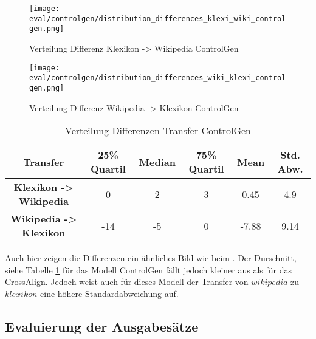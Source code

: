 \begin{figure}[H]
      \texttt{[image: eval/controlgen/distribution\_differences\_klexi\_wiki\_controlgen.png]}
      \caption{Verteilung Differenz Klexikon -> Wikipedia ControlGen}\label{fig:distribution_transfer_klexi_wiki_controlgen}
    \endminipage\hfill
      \texttt{[image: eval/controlgen/distribution\_differences\_wiki\_klexi\_controlgen.png]}
      \caption{Verteilung Differenz Wikipedia -> Klexikon ControlGen}\label{fig:distribution_transfer_wiki_klexi_controlgen}
    \endminipage\hfill      
 \end{figure}
 \begin{table}[H]
    \centering
    \begin{tabular}{|c|c|c|c|c|c|}
      \hline
      \textbf{Transfer}& \textbf{25\% Quartil}& \textbf{Median}& \textbf{75\% Quartil} & \textbf{Mean} &
      \textbf{Std. Abw.}\\
      \hline
      \textbf{Klexikon -> Wikipedia}& 0 & 2 & 3 & 0.45 & 4.9\\
      \hline
      \textbf{Wikipedia -> Klexikon}& -14 & -5 & 0 & -7.88 & 9.14\\
      \hline
    \end{tabular}
    \caption{Verteilung Differenzen Transfer ControlGen}
    \label{tab:distribution_eval_diff_controlgen}
  \end{table}  
\noindent
\newline
Auch hier zeigen die Differenzen ein ähnliches Bild wie beim . Der Durschnitt, siehe
Tabelle \ref{tab:distribution_eval_diff_controlgen} für das Modell ControlGen fällt jedoch kleiner aus als für das
CrossAlign. Jedoch weist auch für dieses Modell der Transfer von $ wikipedia $ zu $ klexikon $ eine höhere
Standardabweichung auf.

\subsection{Evaluierung der Ausgabesätze}
\label{sec:eval_output}

